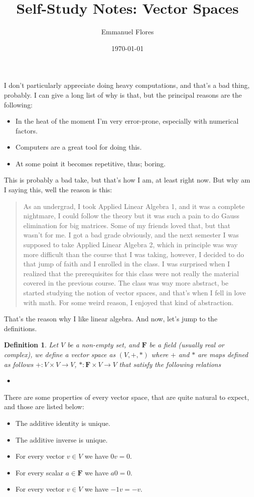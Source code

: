 \documentclass{article}
\title{Self-Study Notes: Vector Spaces}
\author{Emmanuel Flores}
\date{\today}
\newtheorem{definition}{Definition}
\begin{document}
\maketitle	
I don't particularly appreciate doing heavy computations, and that's a bad thing, probably. I can give a long list of why is that, but the	 principal reasons are the following:
	\begin{itemize}
		\item In the heat of the moment I'm very error-prone, especially with numerical factors.
		\item Computers are a great tool for doing this.
		\item At some point it becomes repetitive, thus; boring.
	\end{itemize}
This is probably a bad take, but that's how I am, at least right now. But why am I saying this, well the reason is this: 
\begin{quote}
	As an undergrad, I took Applied Linear Algebra 1, and it was a complete nightmare, I could follow the theory but it was such a pain to do Gauss elimination for big matrices. Some of my friends loved that, but that wasn't for me. I got a bad grade obviously, and the next semester I was supposed to take Applied Linear Algebra 2, which in principle was way more difficult than the course that I was taking, however, I decided to do that jump of faith and I enrolled in the class. I was surprised when I realized that the prerequisites for this class were not really the material covered in the previous course. The class was way more abstract, be started studying the notion of vector spaces, and that's when I fell in love with math. For some weird reason, I enjoyed that kind of abstraction.
\end{quote}
That's the reason why I like linear algebra. And now, let's jump to the definitions.

\begin{definition}
	Let $V$ be a non-empty set, and $\mathbf{F}$ be a field (usually real or complex), we define a vector space as $(V,+,*)$ where $+$ and $*$ are maps defined as follows $+:V\times V\rightarrow V$, $*: \mathbf{F}\times V\rightarrow V$ that satisfy the following relations
	\begin{itemize}
		\item 
	\end{itemize}
\end{definition}
	
There are some properties of every vector space, that are quite natural to expect, and those are listed below:
\begin{itemize}
	\item The additive identity is unique.
	\item The additive inverse is unique.
	\item For every vector $v\in V$ we have $0v = 0$.
	\item For every scalar $a\in \mathbf{F}$ we have $a0=0$.
	\item For every vector $v\in V$ we have $-1v = -v$.
\end{itemize}
	
\end{document}
